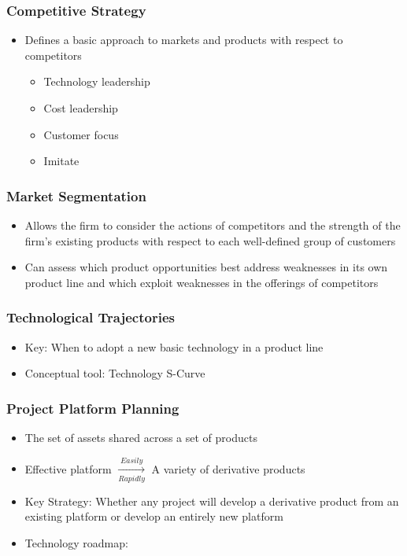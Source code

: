 \documentclass[openany,12pt,a4paper]{book}
\begin{document}
\subsubsection{Competitive Strategy}
\begin{itemize}
    \item Defines a basic approach to markets and products with respect to competitors
    \begin{itemize}
        \item Technology leadership
        \item Cost leadership
        \item Customer focus
        \item Imitate
    \end{itemize}
\end{itemize}
\subsubsection{Market Segmentation}
\begin{itemize}
    \item Allows the firm to consider the actions of competitors and the strength of the firm’s existing products with respect to each well-defined group of customers
    \item Can assess which product opportunities best address weaknesses in its own product line and which exploit weaknesses in the offerings of competitors
\end{itemize}
\subsubsection{Technological Trajectories}
\begin{itemize}
    \item Key: When to adopt a new basic technology in a product line
    \item Conceptual tool: Technology S-Curve
\end{itemize}
\subsubsection{Project Platform Planning}
\begin{itemize}
    \item The set of assets shared across a set of products
    \item Effective platform $\xrightarrow[Rapidly]{Easily}$ A variety of derivative products
    \item Key Strategy: Whether any project will develop a derivative product from an existing platform or develop an entirely new platform
    \item Technology roadmap: 
\end{itemize}
\end{document}
